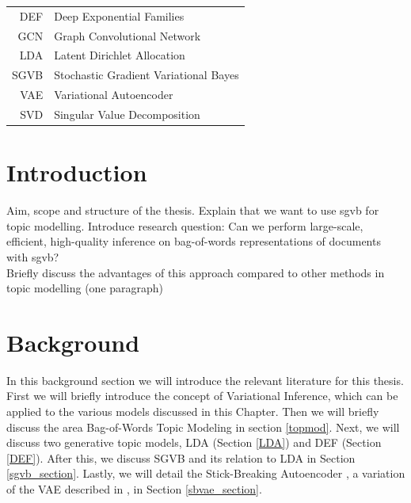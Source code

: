 \documentclass{report}
\begin{document}
\begin{tabular}{r l}
	\hspace{10mm} 
	DEF & Deep Exponential Families \\
	GCN & Graph Convolutional Network \\
	LDA & Latent Dirichlet Allocation \\
	SGVB & Stochastic Gradient Variational Bayes \\
	VAE & Variational Autoencoder \\
	SVD & Singular Value Decomposition \\
\end{tabular}

\tableofcontents

\doublespacing

\chapter{Introduction}
Aim, scope and structure of the thesis. 
Explain that we want to use sgvb for topic modelling. Introduce research question:
Can we perform large-scale, efficient, high-quality inference on bag-of-words representations of documents with sgvb? \\
Briefly discuss the advantages of this approach compared to other methods in topic modelling (one paragraph)


\pagebreak 
\nocite{*}


\chapter{Background}
In this background section we will introduce the relevant literature for this thesis. First we will briefly introduce the concept of Variational Inference, which can be applied to the various models discussed in this Chapter. Then we will briefly discuss the area Bag-of-Words Topic Modeling in section \ref{topmod}. Next, we will discuss two generative topic models, LDA (Section \ref{LDA}) and DEF (Section \ref{DEF}). After this, we discuss SGVB \cite{kingma2013auto} \cite{rezende2014stochastic} and its relation to LDA in Section \ref{sgvb_section}. Lastly, we will detail the Stick-Breaking Autoencoder \cite{nalisnick2016deep}, a variation of the VAE described in \cite{kingma2013auto}, in Section \ref{sbvae_section}.\\
\end{document}
